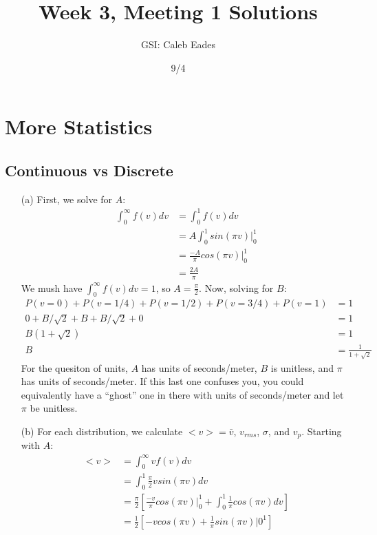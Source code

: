 \documentclass{article}
\begin{document}
	
\title{Week 3, Meeting 1 Solutions}
\author{GSI: Caleb Eades}
\date{9/4}
\maketitle

\section{More Statistics}

\subsection{Continuous vs Discrete}

\begin{itemize}
	\item[(a)] First, we solve for $A$:
	\begin{align*}
	\int_0^{\infty} f(v)dv &= \int_0^1 f(v)dv \\
	&= A\int_0^1 sin(\pi v)|_0^1 \\
	&= \frac{-A}{\pi}cos(\pi v)|_0^1 \\
	&= \frac{2A}{\pi}
	\end{align*}
	We mush have $\int_0^{\infty} f(v)dv = 1$, so $A = \frac{\pi}{2}$. Now, solving for $B$:
	\begin{align*}
	P(v=0) + P(v=1/4) + P(v=1/2) + P(v=3/4) + P(v=1) &= 1 \\
	0 + B/\sqrt{2} + B + B/\sqrt{2} + 0 &= 1 \\
	B(1 + \sqrt{2}) &= 1 \\
	B &= \frac{1}{1+\sqrt{2}}
	\end{align*}
	For the quesiton of units, $A$ has units of seconds/meter, $B$ is unitless, and $\pi$ has units of seconds/meter. If this last one confuses you, you could equivalently have a ``ghost'' one in there with units of seconds/meter and let $\pi$ be unitless.
	\item[(b)] For each distribution, we calculate $<v> = \bar{v}$, $v_{rms}$, $\sigma$, and $v_p$. Starting with $A$:
	\begin{align*}
	<v> &= \int_0^{\infty} vf(v)dv \\
	&= \int_0^1 \frac{\pi}{2}vsin(\pi v)dv \\
	&= \frac{\pi}{2}\left[\frac{-v}{\pi}cos(\pi v)|_0^1 + \int_0^1\frac{1}{\pi}cos(\pi v)dv\right] \\
	&= \frac{1}{2}\left[-vcos(\pi v) + \frac{1}{\pi} sin(\pi v)|0^1\right] \\

\end{align*}
\end{itemize}
\end{document}
